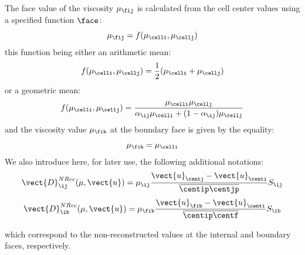 The face value of the viscosity $\mu_{\fij}$ is calculated from the cell center
values using a specified function $\face$:
\begin{equation*}
\mu_{\fij} = f(\mu_\celli,\mu_\cellj)
\end{equation*}
this function being either an arithmetic mean:
\begin{equation}
f(\mu_\celli,\mu_\cellj)= \frac{1}{2}(\mu_\celli+\mu_\cellj)
\end{equation}
or a geometric mean:
\begin{equation}
f(\mu_\celli,\mu_\cellj) = \dfrac{\mu_\celli \mu_\cellj}{\alpha_{\ij}
\mu_\celli+(1-\alpha_{\ij}) \mu_\cellj}
\end{equation}
and the viscosity value  $\mu_{\fib}$ at the boundary face is given by the equality:
\begin{equation}
\mu_{\fib}=\mu_\celli
\end{equation}
We also introduce here, for later use, the following additional notations:
\begin{equation}
\vect{D}^{NRec}_{\ij}(\mu, \vect{u}) = \mu_{\ij}
\dfrac{\vect{u}_{\centj}-\vect{u}_{\centi}}{\overline{\centip \centjp}} S_{\ij}
\end{equation}
\begin{equation}
\vect{D}^{NRec}_{\ib}(\mu, \vect{u}) = \mu_{\fib}
\dfrac{\vect{u}_{\fib}-\vect{u}_{\centi}}{\overline{\centip \centf}} S_{\ib}
\end{equation}

which correspond to the non-reconstructed values at the internal and boundary
faces, respectively.

